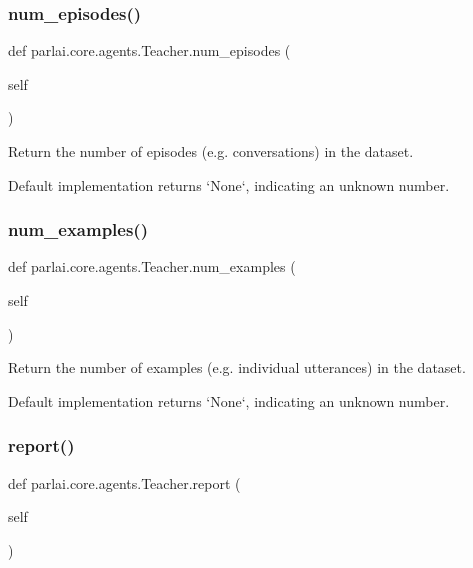 \subsubsection{\texorpdfstring{num\+\_\+episodes()}{num\_episodes()}}
{\footnotesize\ttfamily def parlai.\+core.\+agents.\+Teacher.\+num\+\_\+episodes (\begin{DoxyParamCaption}\item[{}]{self }\end{DoxyParamCaption})}

\begin{DoxyVerb}Return the number of episodes (e.g. conversations) in the dataset.

Default implementation returns `None`, indicating an unknown number.
\end{DoxyVerb}
 \mbox{\label{classparlai_1_1core_1_1agents_1_1Teacher_a93370e4e99236e8ad267b40cd4437920}} 
\subsubsection{\texorpdfstring{num\+\_\+examples()}{num\_examples()}}
{\footnotesize\ttfamily def parlai.\+core.\+agents.\+Teacher.\+num\+\_\+examples (\begin{DoxyParamCaption}\item[{}]{self }\end{DoxyParamCaption})}

\begin{DoxyVerb}Return the number of examples (e.g. individual utterances) in the dataset.

Default implementation returns `None`, indicating an unknown number.
\end{DoxyVerb}
 \mbox{\label{classparlai_1_1core_1_1agents_1_1Teacher_aa0afab11fb5f3f26ac59576f064623a4}} 
\subsubsection{\texorpdfstring{report()}{report()}}
{\footnotesize\ttfamily def parlai.\+core.\+agents.\+Teacher.\+report (\begin{DoxyParamCaption}\item[{}]{self }\end{DoxyParamCaption})}

